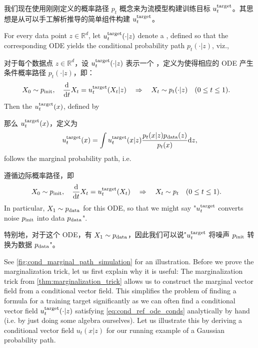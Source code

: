 我们现在使用刚刚定义的概率路径 $p_t$ 概念来为流模型构建训练目标 $u^{\text{target}}_t$。其思想是从可以手工解析推导的简单组件构建 $u^{\text{target}}_t$。
\begin{theorem}
\label{thm:marginalization_trick}
For every data point $z\in \mathbb{R}^d$, let $u^{\text{target}}_t(\cdot|z)$ denote a , defined so that the corresponding ODE yields the conditional probability path $p_t(\cdot|z)$, viz.,

对于每个数据点 $z\in \mathbb{R}^d$，设 $u^{\text{target}}_t(\cdot|z)$ 表示一个 ，定义为使得相应的 ODE 产生条件概率路径 $p_t(\cdot|z)$，即：
\begin{align}
\label{eq:cond_ref_ode_conds}
    X_0&\sim p_{\rm{init}},\quad \frac{\mathrm{d}}{\mathrm{d} t}X_t =u^{\text{target}}_t(X_t|z)\quad \Rightarrow \quad X_t\sim p_t(\cdot|z)\quad (0\leq t\leq 1).
\end{align}
Then the  $u^{\text{target}}_t(x)$, defined by

那么  $u^{\text{target}}_t(x)$，定义为
\begin{align}
    \label{eq:marginal_vector_field}
    u^{\text{target}}_t(x) = \int u^{\text{target}}_t(x|z)\frac{p_t(x|z)p_{\rm{data}}(z)}{p_t(x)}\mathrm{d} z,
\end{align}
follows the marginal probability path, i.e. 

遵循边际概率路径，即 
\begin{align}
\label{eq:marginal_ode_follows_marginal_path}
    X_0&\sim p_{\rm{init}},\quad \frac{\mathrm{d}}{\mathrm{d} t}X_t =u^{\text{target}}_t(X_t)\quad \Rightarrow \quad X_t\sim p_t\quad (0\leq t\leq 1).
\end{align}
In particular, $X_1\sim p_{\rm{data}}$ for this ODE, so that we might say "$u^{\text{target}}_t$ converts noise $p_{\rm{init}}$ into data $p_{\rm{data}}$".

特别地，对于这个 ODE，有 $X_1\sim p_{\rm{data}}$，因此我们可以说"$u^{\text{target}}_t$ 将噪声 $p_{\rm{init}}$ 转换为数据 $p_{\rm{data}}$"。
\end{theorem}
See \cref{fig:cond_marginal_path_simulation} for an illustration. Before we prove the marginalization trick, let us first explain why it is useful: The marginalization trick from \cref{thm:marginalization_trick} allows us to construct the marginal vector field from a conditional vector field. This simplifies the problem of finding a formula for a training target significantly as we can often find a conditional vector field $u^{\text{target}}_t(\cdot|z)$ satisfying \cref{eq:cond_ref_ode_conds} analytically by hand (i.e. by just doing some algebra ourselves). Let us illustrate this by deriving a conditional vector field $u_t(x|z)$ for our running example of a Gaussian probability path.

